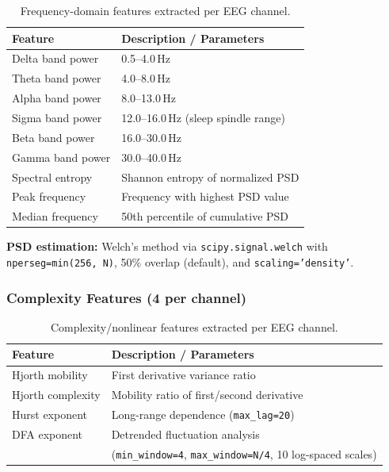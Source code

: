 \begin{table}[h]
\centering
\caption{Frequency-domain features extracted per EEG channel.}
\label{tab:freq_features}
\begin{tabular}{l l}
\toprule
\textbf{Feature} & \textbf{Description / Parameters} \\
\midrule
Delta band power      & 0.5--4.0\,Hz \\
Theta band power      & 4.0--8.0\,Hz \\
Alpha band power      & 8.0--13.0\,Hz \\
Sigma band power      & 12.0--16.0\,Hz (sleep spindle range) \\
Beta band power       & 16.0--30.0\,Hz \\
Gamma band power      & 30.0--40.0\,Hz \\
Spectral entropy      & Shannon entropy of normalized PSD \\
Peak frequency        & Frequency with highest PSD value \\
Median frequency      & 50th percentile of cumulative PSD \\
\bottomrule
\end{tabular}
\end{table}

\textbf{PSD estimation:} Welch's method via \texttt{scipy.signal.welch} with \texttt{nperseg=min(256, N)}, 50\% overlap (default), and \texttt{scaling='density'}.

\subsubsection{Complexity Features (4 per channel)}

\begin{table}[h]
\centering
\caption{Complexity/nonlinear features extracted per EEG channel.}
\label{tab:complexity_features}
\begin{tabular}{l l}
\toprule
\textbf{Feature} & \textbf{Description / Parameters} \\
\midrule
Hjorth mobility    & First derivative variance ratio \\
Hjorth complexity  & Mobility ratio of first/second derivative \\
Hurst exponent     & Long-range dependence (\texttt{max\_lag=20}) \\
DFA exponent       & Detrended fluctuation analysis \\
                   & (\texttt{min\_window=4}, \texttt{max\_window=N/4}, 10 log-spaced scales) \\
\bottomrule
\end{tabular}
\end{table}

